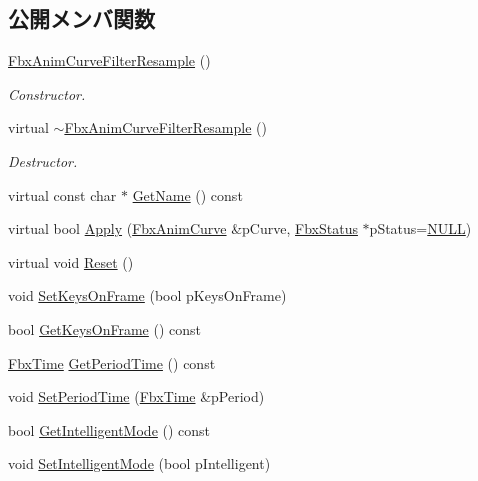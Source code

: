 \subsection*{公開メンバ関数}
\begin{DoxyCompactItemize}
\item 
\hyperlink{class_fbx_anim_curve_filter_resample_ae5da0aba84bf6db3d9cda6a4aeb5824f}{Fbx\+Anim\+Curve\+Filter\+Resample} ()
\begin{DoxyCompactList}\small\item\em Constructor. \end{DoxyCompactList}\item 
virtual \hyperlink{class_fbx_anim_curve_filter_resample_a9424bc3a1a9796265126c399d8e8fb5a}{$\sim$\+Fbx\+Anim\+Curve\+Filter\+Resample} ()
\begin{DoxyCompactList}\small\item\em Destructor. \end{DoxyCompactList}\item 
virtual const char $\ast$ \hyperlink{class_fbx_anim_curve_filter_resample_a67303296eba915d2a9fde63c2557c3f9}{Get\+Name} () const
\item 
virtual bool \hyperlink{class_fbx_anim_curve_filter_resample_aa4edbed0ce74836a77fe4fd907c604a6}{Apply} (\hyperlink{class_fbx_anim_curve}{Fbx\+Anim\+Curve} \&p\+Curve, \hyperlink{class_fbx_status}{Fbx\+Status} $\ast$p\+Status=\hyperlink{fbxarch_8h_a070d2ce7b6bb7e5c05602aa8c308d0c4}{N\+U\+LL})
\item 
virtual void \hyperlink{class_fbx_anim_curve_filter_resample_a149622ab0dd1ffd26ca1e59f31aaed93}{Reset} ()
\item 
void \hyperlink{class_fbx_anim_curve_filter_resample_abb2e4701aa3e44d945cfa92254aabbb0}{Set\+Keys\+On\+Frame} (bool p\+Keys\+On\+Frame)
\item 
bool \hyperlink{class_fbx_anim_curve_filter_resample_af91489566c2c8445995dd265648646ea}{Get\+Keys\+On\+Frame} () const
\item 
\hyperlink{class_fbx_time}{Fbx\+Time} \hyperlink{class_fbx_anim_curve_filter_resample_a0efe607fa3febdd058b03a7ac444bfd4}{Get\+Period\+Time} () const
\item 
void \hyperlink{class_fbx_anim_curve_filter_resample_a1d2369b1cd4a656a79e05b10f7faadd4}{Set\+Period\+Time} (\hyperlink{class_fbx_time}{Fbx\+Time} \&p\+Period)
\item 
bool \hyperlink{class_fbx_anim_curve_filter_resample_ae0b81c640c35b6b2d0a34b5586f2f053}{Get\+Intelligent\+Mode} () const
\item 
void \hyperlink{class_fbx_anim_curve_filter_resample_a8ac3cafa7fe863a9d3205452f6f15c49}{Set\+Intelligent\+Mode} (bool p\+Intelligent)
\end{DoxyCompactItemize}
